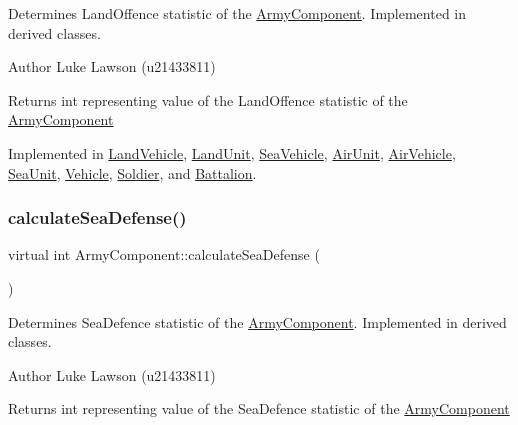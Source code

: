 Determines Land\+Offence statistic of the \mbox{\hyperlink{class_army_component}{Army\+Component}}. Implemented in derived classes. 

\begin{DoxyAuthor}{Author}
Luke Lawson (u21433811) 
\end{DoxyAuthor}
\begin{DoxyReturn}{Returns}
int representing value of the Land\+Offence statistic of the \mbox{\hyperlink{class_army_component}{Army\+Component}} 
\end{DoxyReturn}


Implemented in \mbox{\hyperlink{class_land_vehicle_ae8604789808fddcd4e58122c11ee18cd}{Land\+Vehicle}}, \mbox{\hyperlink{class_land_unit_a8f95f94a08fbdd268b85160dbd578947}{Land\+Unit}}, \mbox{\hyperlink{class_sea_vehicle_a6a07126cd3e346097f967e3a8038622f}{Sea\+Vehicle}}, \mbox{\hyperlink{class_air_unit_ab5f13baf31eafe62bf482ec4501f4975}{Air\+Unit}}, \mbox{\hyperlink{class_air_vehicle_afbbfd8dd22d786ca679669f2ae5f9f41}{Air\+Vehicle}}, \mbox{\hyperlink{class_sea_unit_a5b21e648106a6ec40c79a1916e9fe674}{Sea\+Unit}}, \mbox{\hyperlink{class_vehicle_a6b272c05209a8907ebe6229e66317f4a}{Vehicle}}, \mbox{\hyperlink{class_soldier_ac0add7efb3192adb809bc1746c880fc0}{Soldier}}, and \mbox{\hyperlink{class_battalion_a4b7a80080e4333259679e8b2cb522ae9}{Battalion}}.

\mbox{\label{class_army_component_af5656dd9c12738ec90ea7886fd7ee34a}} 
\subsubsection{\texorpdfstring{calculateSeaDefense()}{calculateSeaDefense()}}
{\footnotesize\ttfamily virtual int Army\+Component\+::calculate\+Sea\+Defense (\begin{DoxyParamCaption}{ }\end{DoxyParamCaption})\hspace{0.3cm}{\ttfamily [pure virtual]}}



Determines Sea\+Defence statistic of the \mbox{\hyperlink{class_army_component}{Army\+Component}}. Implemented in derived classes. 

\begin{DoxyAuthor}{Author}
Luke Lawson (u21433811) 
\end{DoxyAuthor}
\begin{DoxyReturn}{Returns}
int representing value of the Sea\+Defence statistic of the \mbox{\hyperlink{class_army_component}{Army\+Component}} 
\end{DoxyReturn}


